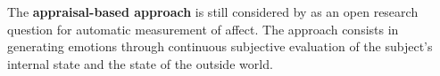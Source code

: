 \newline\newline
The \textbf{appraisal-based approach} is still considered by \citep{Gunes:2011:EmotionRepresentationContinuous} as an open research question for automatic measurement of affect. The approach consists in generating emotions through continuous subjective evaluation of the subject's internal state and the state of the outside world.



